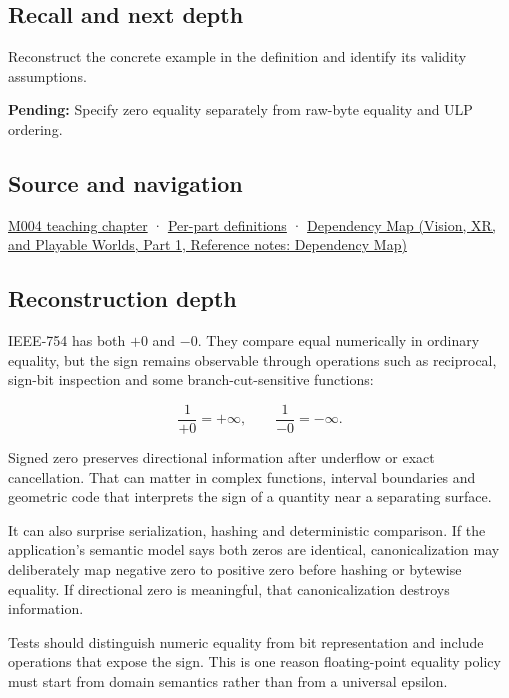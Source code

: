 \subsection{Recall and next depth}\label{appendix-3a048f032c1f-recall-and-next-depth}

\hypertarget{appendix-3a048f032c1f-recall-and-next-depth}{}

Reconstruct the concrete example in the definition and identify its validity assumptions.

\textbf{Pending:} Specify zero equality separately from raw-byte equality and ULP ordering.

\subsection{Source and navigation}\label{appendix-3a048f032c1f-source-and-navigation}

\hypertarget{appendix-3a048f032c1f-source-and-navigation}{}

\hyperref[01-foundations-i-ch001-a-stretching-ruler-for-real-valued-quantities]{M004 teaching chapter} · \hyperref[appendix-fd090d982a15-m004---parts-61-76]{Per-part definitions} · \href{../07-Vision-XR-and-Playable-Worlds-P01/main.pdf\#appendix-4ad47bdd269a}{Dependency Map (Vision, XR, and Playable Worlds, Part 1, Reference notes: Dependency Map)}

\subsection{Reconstruction depth}\label{appendix-3a048f032c1f-reconstruction-depth}

\hypertarget{appendix-3a048f032c1f-reconstruction-depth}{}

IEEE-754 has both \(+0\) and \(-0\). They compare equal numerically in ordinary equality, but the sign remains observable through operations such as reciprocal, sign-bit inspection and some branch-cut-sensitive functions:

\[
\frac{1}{+0}=+\infty,
\qquad
\frac{1}{-0}=-\infty.
\]

Signed zero preserves directional information after underflow or exact cancellation. That can matter in complex functions, interval boundaries and geometric code that interprets the sign of a quantity near a separating surface.

It can also surprise serialization, hashing and deterministic comparison. If the application's semantic model says both zeros are identical, canonicalization may deliberately map negative zero to positive zero before hashing or bytewise equality. If directional zero is meaningful, that canonicalization destroys information.

Tests should distinguish numeric equality from bit representation and include operations that expose the sign. This is one reason floating-point equality policy must start from domain semantics rather than from a universal epsilon.
